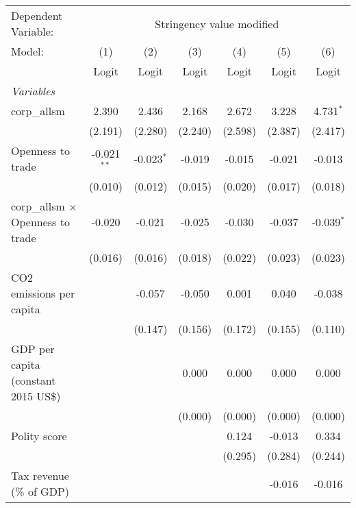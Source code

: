 
\begingroup
\centering
\begin{tabular}{lcccccc}
   \toprule
   Dependent Variable: & \multicolumn{6}{c}{Stringency value modified}\\
   Model:                                   & (1)           & (2)          & (3)     & (4)     & (5)     & (6)\\  
                                            &  Logit        & Logit        & Logit   & Logit   & Logit   & Logit\\  
   \midrule
   \emph{Variables}\\
   corp\_allsm                              & 2.390         & 2.436        & 2.168   & 2.672   & 3.228   & 4.731$^{*}$\\   
                                            & (2.191)       & (2.280)      & (2.240) & (2.598) & (2.387) & (2.417)\\   
   Openness to trade                        & -0.021$^{**}$ & -0.023$^{*}$ & -0.019  & -0.015  & -0.021  & -0.013\\   
                                            & (0.010)       & (0.012)      & (0.015) & (0.020) & (0.017) & (0.018)\\   
   corp\_allsm $\times$ Openness to trade   & -0.020        & -0.021       & -0.025  & -0.030  & -0.037  & -0.039$^{*}$\\   
                                            & (0.016)       & (0.016)      & (0.018) & (0.022) & (0.023) & (0.023)\\   
   CO2 emissions per capita                 &               & -0.057       & -0.050  & 0.001   & 0.040   & -0.038\\   
                                            &               & (0.147)      & (0.156) & (0.172) & (0.155) & (0.110)\\   
   GDP per capita (constant 2015 US\$)      &               &              & 0.000   & 0.000   & 0.000   & 0.000\\   
                                            &               &              & (0.000) & (0.000) & (0.000) & (0.000)\\   
   Polity score                             &               &              &         & 0.124   & -0.013  & 0.334\\   
                                            &               &              &         & (0.295) & (0.284) & (0.244)\\   
   Tax revenue (\% of GDP)                  &               &              &         &         & -0.016  & -0.016\\   

\end{tabular}
